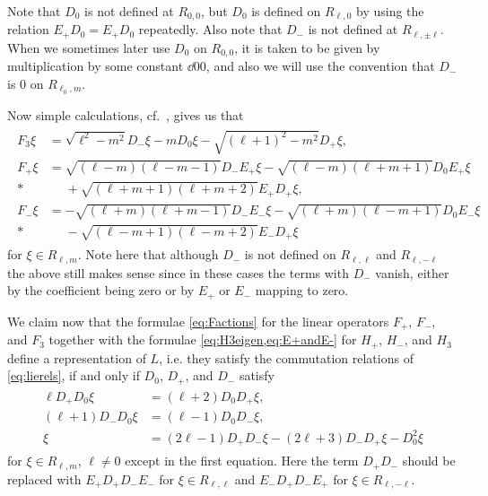 \begin{remark}\label{rem:D0andD-}
  Note that $D_0$ is not defined at $R_{0,0}$, but $D_0$ is defined on $R_{\ell,0}$ by using the relation $E_+D_0=E_+D_0$ repeatedly. Also note that $D_-$ is not defined at $R_{\ell,\pm \ell}$. When we sometimes later use $D_0$ on $R_{0,0}$, it is taken to be given by multiplication by some constant $\dd{0}{0}$, and also we will use the convention that $D_-$ is $0$ on $R_{\ell_0,m}$.
\end{remark}

Now simple calculations, cf.\ , gives us that
\begin{align}\label{eq:Factions}
  \begin{aligned}
    F_3 \xi &= \sqrt{\ell^2-m^2} D_-\xi - m D_0\xi - \sqrt{(\ell+1)^2-m^2}D_+\xi, \\
    F_+ \xi &= \sqrt{(\ell-m)(\ell-m-1)}D_-E_+\xi - \sqrt{(\ell-m)(\ell+m+1)}D_0E_+\xi \\*
    &\phantom{{}={}}{} + \sqrt{(\ell+m+1)(\ell+m+2)}E_+D_+\xi, \\
    F_- \xi &= -\sqrt{(\ell+m)(\ell+m-1)}D_-E_-\xi - \sqrt{(\ell+m)(\ell-m+1)}D_0E_-\xi \\*
    &\phantom{{}={}}{} - \sqrt{(\ell-m+1)(\ell-m+2)}E_-D_+\xi
  \end{aligned}
\end{align}
for $\xi\in R_{\ell,m}$. Note here that although $D_-$ is not defined on $R_{\ell,\ell}$ and $R_{\ell,-\ell}$ the above still makes sense since in these cases the terms with $D_-$ vanish, either by the coefficient being zero or by $E_+$ or $E_-$ mapping to zero.

We claim now that the formulae \cref{eq:Factions} for the linear operators $F_+$, $F_-$, and $F_3$ together with the formulae \cref{eq:H3eigen,eq:E+andE-} for $H_+$, $H_-$, and $H_3$ define a representation of $L$, i.e. they satisfy the commutation relations of \cref{eq:lierels}, if and only if $D_0$, $D_+$, and $D_-$ satisfy
\begin{align}\label{eq:Drels}
  \begin{aligned}
    \ell D_+D_0 \xi &= (\ell+2)D_0 D_+ \xi, \\
    (\ell+1)D_-D_0 \xi &= (\ell-1)D_0D_-\xi, \\
    \xi &= (2\ell-1)D_+D_- \xi - (2\ell+3)D_-D_+\xi - D_0^2\xi
  \end{aligned}
\end{align}
for $\xi\in R_{\ell,m}$, $\ell\neq 0$ except in the first equation. Here the term $D_+D_-$ should be replaced with $E_+D_+D_-E_-$ for $\xi\in R_{\ell,\ell}$ and $E_-D_+D_-E_+$ for $\xi \in R_{\ell,-\ell}$.

